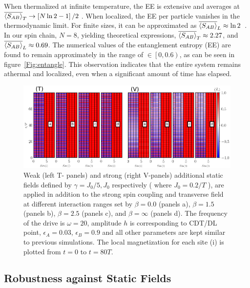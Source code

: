 \documentclass[12pt]{iopart}
\begin{document}
When thermalized at infinite temperature, the EE is extensive and averages at $\displaystyle \overline{\expval{S_{AB}}}_T\rightarrow \left[N \ln{2}-1\right]/2$ \cite{Lu2021}. When localized, the EE per particle vanishes in the thermodynamic limit. For finite sizes, it can be approximated as $\overline{\expval{S_{AB}}}_L\approx \ln{2}$~\cite{sakurai_phys_nodate}. In our spin chain, $N=8$, yielding theoretical expressions, $\overline{\expval{S_{AB}}}_T\approx 2.27$, and $\overline{\expval{S_{AB}}}_L\approx 0.69$. The numerical values of the entanglement entropy (EE) are found to remain approximately in the range of $\in\left[0,0.6\right)$, as can be seen in figure~\ref{Fig:entangle}. This observation indicates that the entire system remains athermal and localized, even when a significant amount of time has elapsed.
\begin{figure}[t!]
	\begin{center}
		\includegraphics[width=15cm]{figure12.pdf}
	\end{center}
	\caption{Weak (left T- panels) and strong (right V-panels) additional static fields defined by $\gamma = J_0/5, J_0$ respectively ( where $J_0=0.2/T$ ), are applied in addition to the strong spin coupling and transverse field at different interaction ranges set by $\beta = 0.0$ (panels a), $\beta= 1.5$ (panels b), $\beta=2.5$ (panels c), and $\beta= \infty$ (panels d). The frequency of the drive is $\omega = 20$, amplitude $h$ is corresponding to CDT/DL point, $\epsilon_A=0.03$, $\epsilon_B=0.9$ and all other parameters are kept similar to previous simulations.  The local magnetization for each site (i) is plotted from $t=0$ to $t=80 T$.}
	\label{Fig:robustness}
\end{figure}	
\subsection{\label{sec:level43} Robustness against Static Fields}
\end{document}
